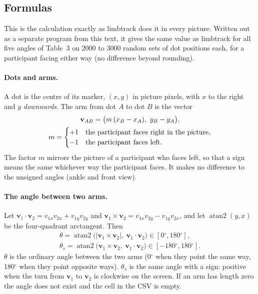 \documentclass[a4paper,10pt]{article}
\newcommand{\lt}{\textsf{limbtrack}}
\newcommand{\dg}{\ensuremath{^\circ}}
\begin{document}
\subsection{Formulas}\label{sec:angle-formulas}
\noindent This is the calculation exactly as \lt{} does it in every picture. Written out as a separate program from this text, it gives the
same value as \lt{} for all five angles of Table~3 on 2000 to 3000 random sets of dot positions each, for a participant facing either
way (no difference beyond rounding).

\paragraph{Dots and arms.} A dot is the centre of its marker, $(x,y)$ in picture pixels, with $x$ to the right and $y$ \emph{downwards}.
The arm from dot $A$ to dot $B$ is the vector
\begin{gather}
  \mathbf{v}_{AB}=\bigl(m\,(x_B-x_A),\ y_B-y_A\bigr),\label{eq:arm}\\
  m=\begin{cases}+1 & \text{the participant faces right in the picture,}\\ -1 & \text{the participant faces left.}\end{cases}\notag
\end{gather}
The factor $m$ mirrors the picture of a participant who faces left, so that a sign means the same whichever way the participant faces. It
makes no difference to the unsigned angles (ankle and front view).

\paragraph{The angle between two arms.} Let $\mathbf{v}_1\cdot\mathbf{v}_2=v_{1x}v_{2x}+v_{1y}v_{2y}$ and
$\mathbf{v}_1\times\mathbf{v}_2=v_{1x}v_{2y}-v_{1y}v_{2x}$, and let $\operatorname{atan2}(y,x)$ be the four-quadrant arctangent. Then
\begin{gather}
  \theta=\operatorname{atan2}\bigl(\lvert\mathbf{v}_1\times\mathbf{v}_2\rvert,\ \mathbf{v}_1\cdot\mathbf{v}_2\bigr)\in[0\dg,180\dg],\label{eq:theta}\\
  \theta_s=\operatorname{atan2}\bigl(\mathbf{v}_1\times\mathbf{v}_2,\ \mathbf{v}_1\cdot\mathbf{v}_2\bigr)\in[-180\dg,180\dg].\label{eq:thetas}
\end{gather}
$\theta$ is the ordinary angle between the two arms (0\dg{} when they point the same way, 180\dg{} when they point opposite ways). $\theta_s$ is
the same angle with a sign: positive when the turn from $\mathbf{v}_1$ to $\mathbf{v}_2$ is clockwise on the screen. If an arm has length zero
the angle does not exist and the cell in the CSV is empty.
\end{document}
